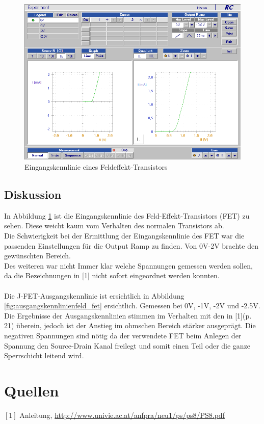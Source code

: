 \documentclass[12pt,a4paper]{article}
\begin{document}
\begin{multicols}{2}
\begin{figure}[H]
	\centering
	\includegraphics[scale=0.45]{./data/Braun_Kurz_PS8/FET_Eingangskennlinie.png}
	\caption{Eingangskennlinie eines Feldeffekt-Transistors}
	\label{fig:eingangskennlinien_fet}
\end{figure}

\subsection{Diskussion}
In Abbildung \ref{fig:eingangskennlinien_fet} ist die Eingangskennlinie des Feld-Effekt-Transistors (FET) zu sehen.
Diese weicht kaum vom Verhalten des normalen Transistors ab.\\
Die Schwierigkeit bei der Ermittlung der Eingangskennlinie des FET war die passenden Einstellungen für die Output Ramp zu finden. Von 0V-2V brachte den gewünschten Bereich.\\ 
Des weiteren war nicht Immer klar welche Spannungen gemessen werden sollen, da die Bezeichnungen in [1] nicht sofort eingeordnet werden konnten.\\
\\
Die J-FET-Ausgangskennlinie ist ersichtlich in Abbildung \ref{fig:ausgangskennlinienfeld_fet} ersichtlich. Gemessen bei 0V, -1V, -2V und -2.5V.\\
Die Ergebnisse der Ausgangskennlinien stimmen im Verhalten mit den in [1](p. 21) überein, jedoch ist der Anstieg im ohmschen Bereich stärker ausgeprägt. Die negativen Spannungen sind nötig da der verwendete FET beim Anlegen der Spannung den Source-Drain Kanal freilegt und somit einen Teil oder die ganze Sperrschicht leitend wird.


\section{Quellen}
$[1]$ Anleitung, \url{http://www.univie.ac.at/anfpra/neu1/ps/ps8/PS8.pdf}\\

\end{multicols}
\end{document}
